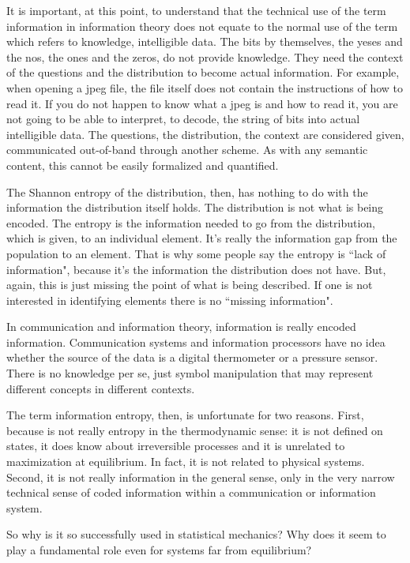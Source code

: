 \documentclass{article}
\begin{document}
It is important, at this point, to understand that the technical use of the term information in information theory does not equate to the normal use of the term which refers to knowledge, intelligible data. The bits by themselves, the yeses and the nos, the ones and the zeros, do not provide knowledge. They need the context of the questions and the distribution to become actual information. For example, when opening a jpeg file, the file itself does not contain the instructions of how to read it. If you do not happen to know what a jpeg is and how to read it, you are not going to be able to interpret, to decode, the string of bits into actual intelligible data. The questions, the distribution, the context are considered given, communicated out-of-band through another scheme. As with any semantic content, this cannot be easily formalized and quantified.

The Shannon entropy of the distribution, then, has nothing to do with the information the distribution itself holds. The distribution is not what is being encoded. The entropy is the information needed to go from the distribution, which is given, to an individual element. It's really the information gap from the population to an element. That is why some people say the entropy is ``lack of information", because it's the information the distribution does not have. But, again, this is just missing the point of what is being described. If one is not interested in identifying elements there is no ``missing information".

In communication and information theory, information is really encoded information. Communication systems and information processors have no idea whether the source of the data is a digital thermometer or a pressure sensor. There is no knowledge per se, just symbol manipulation that may represent different concepts in different contexts.

The term information entropy, then, is unfortunate for two reasons. First, because is not really entropy in the thermodynamic sense: it is not defined on states, it does know about irreversible processes and it is unrelated to maximization at equilibrium. In fact, it is not related to physical systems. Second, it is not really information in the general sense, only in the very narrow technical sense of coded information within a communication or information system.

So why is it so successfully used in statistical mechanics? Why does it seem to play a fundamental role even for systems far from equilibrium?
\end{document}
